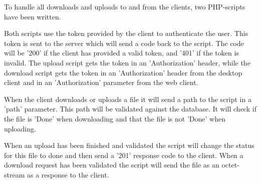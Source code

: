 To handle all downloads and uploads to and from the clients, two PHP-scripts have been written. 

Both scripts use the token provided by the client to authenticate the user. This token is sent to the server which will send a code back to the script. The code will be '200' if the client has provided a valid token, and '401' if the token is invalid. The upload script gets the token in an 'Authorization' header, while the download script gets the token in an 'Authorization' header from the desktop client and in an 'Authorization' parameter from the web client.

When the client downloads or uploads a file it will send a path to the script in a 'path' parameter. This path will be validated against the database. It will check if the file is 'Done' when downloading and that the file is not 'Done' when uploading.

When an upload has been finished and validated the script will change the status for this file to done and then send a '201' response code to the client. When a download request has been validated the script will send the file as an octet-stream as a response to the client.
